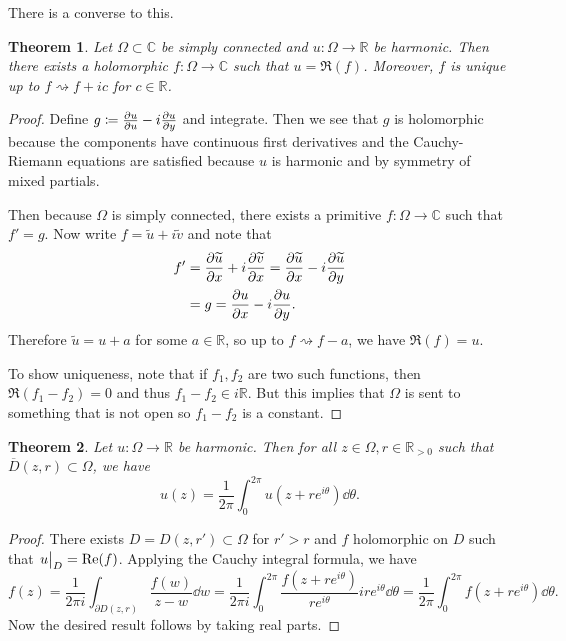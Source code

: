 \documentclass[leqno, openany]{memoir}
\newtheorem{thm}{Theorem}[section]
\theoremstyle{definition}
\theoremstyle{remark}
\theoremstyle{plain}
\theoremstyle{definition}
\theoremstyle{remark}
\newcommand{\R}{\mathbb{R}}
\newcommand{\C}{\mathbb{C}}
\newcommand{\ol}[1]{\overline{#1}}
\newcommand{\wt}[1]{\widetilde{#1}}
\begin{document}
There is a converse to this.

\begin{thm}
    Let $\Omega \subset \C$ be simply connected and $u \colon \Omega \to \R$ be harmonic. Then there exists a holomorphic $f \colon \Omega \to \C$ such that $u = \Re(f)$. Moreover, $f$ is unique up to $f \rightsquigarrow f + ic$ for $c \in \R$.
\end{thm}

\begin{proof}
    Define $g \coloneqq \pdv{u}{u} - i \pdv{u}{y}$ and integrate. Then we see that $g$ is holomorphic because the components have continuous first derivatives and the Cauchy-Riemann equations are satisfied because $u$ is harmonic and by symmetry of mixed partials.

    Then because $\Omega$ is simply connected, there exists a primitive $f \colon \Omega \to \C$ such that $f' = g$. Now write $f = \wt{u} + i \wt{v}$ and note that 
    \begin{align*} 
        f' &= \pdv{\wt{u}}{x} + i \pdv{\wt{v}}{x} = \pdv{\wt{u}}{x} - i \pdv{\wt{u}}{y} \\
           &= g = \pdv{u}{x} - i \pdv{u}{y}. 
    \end{align*}
    Therefore $\wt{u} = u + a$ for some $a \in \R$, so up to $f \rightsquigarrow f - a$, we have $\Re(f) = u$.

    To show uniqueness, note that if $f_1, f_2$ are two such functions, then $\Re(f_1 - f_2) = 0$ and thus $f_1 - f_2 \in i\R$. But this implies that $\Omega$ is sent to something that is not open so $f_1 - f_2$ is a constant.
\end{proof}

\begin{thm}
    Let $u \colon \Omega \to \R$ be harmonic. Then for all $z \in \Omega, r \in \R_{>0}$ such that $\ol{D}(z,r) \subset \Omega$, we have
    \[ u(z) = \frac{1}{2 \pi} \int_0^{2 \pi} u(z + re^{i\theta}) \dd{\theta}. \]
\end{thm}

\begin{proof}
    There exists $D = D(z, r') \subset \Omega$ for $r' > r$ and $f$ holomorphic on $D$ such that $\eval{u}_D = \Re(f)$. Applying the Cauchy integral formula, we have
    \[ f(z) = \frac{1}{2 \pi i} \int_{\partial D(z, r)} \frac{f(w)}{z-w} \dd{w} = \frac{1}{2 \pi i} \int_0^{2 \pi} \frac{f(z+ re^{i\theta})}{re^{i\theta}} ire^{i\theta} \dd{\theta} = \frac{1}{2\pi} \int_0^{2\pi} f(z+re^{i\theta}) \dd{\theta}. \]
    Now the desired result follows by taking real parts.
\end{proof}
\end{document}
